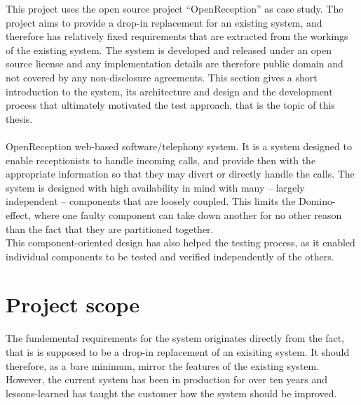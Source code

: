 This project uses the open source project ``OpenReception'' as case study. The project aims to provide a drop-in replacement for an existing system, and therefore has relatively fixed requirements that are extracted from the workings of the existing system. The system is developed and released under an open source license and any implementation details are therefore public domain and not covered by any non-disclosure agreements. This section gives a short introduction to the system, its architecture and design and the development process that ultimately motivated the test approach, that is the topic of this thesis.\\\\
OpenReception web-based software/telephony system. It is a system designed to enable receptionists to handle incoming calls, and provide then with the appropriate information so that they may divert or directly handle the calls. The system is designed with high availability in mind with many -- largely independent -- components that are loosely coupled. This limits the Domino-effect, where one faulty component can take down another for no other reason than the fact that they are partitioned together.\\ This component-oriented design has also helped the testing process, as it enabled individual components to be tested and verified independently of the others.

\section{Project scope}
The fundemental requirements for the system originates directly from the fact, that is is supposed to be a drop-in replacement of an exisiting system. It should therefore, as a bare minimum, mirror the features of the existing system.\\
However, the current system has been in production for over ten years and lessons-learned has taught the customer how the system should be improved. %

